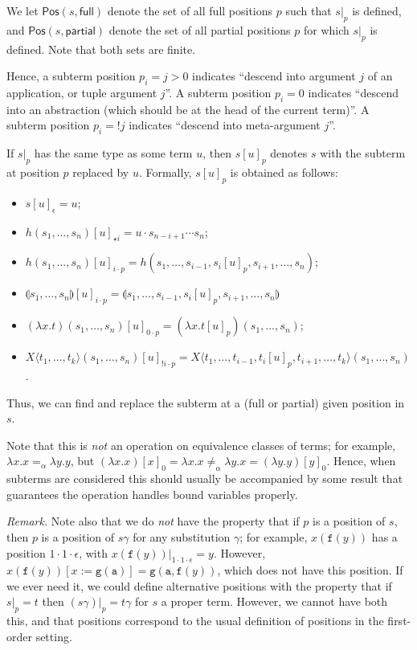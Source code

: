 \documentclass{lmcs}
\theoremstyle{theorem}\newtheorem{theorem}{Theorem}
\theoremstyle{theorem}\newtheorem{lemma}[theorem]{Lemma}
\theoremstyle{theorem}\newtheorem{corollary}[theorem]{Corollary}
\theoremstyle{definition}\newtheorem{definition}[theorem]{Definition}
\theoremstyle{definition}\newtheorem{example}[theorem]{Example}
\newcommand{\Positions}{\mathsf{Pos}}
\newcommand{\identifier}[1]{\mathtt{#1}}
\newcommand{\afun}{\identifier{f}}
\newcommand{\bfun}{\identifier{g}}
\newcommand{\avar}{x}
\newcommand{\Avar}{X}
\newcommand{\abs}[2]{\lambda #1.#2}
\newcommand{\meta}[2]{#1\langle#2\rangle}
\newcommand{\tuple}[2]{\llparenthesis #1,\dots,#2 \rrparenthesis}
\newcommand{\tuplelong}[1]{\llparenthesis #1 \rrparenthesis}
\begin{document}
We let $\Positions(s,\mathsf{full})$ denote the set of all full positions $p$
such that $s|_p$ is defined, and $\Positions(s,\mathsf{partial})$ denote the
set of all partial positions $p$ for which $s|_p$ is defined.  Note that both
sets are finite.

Hence, a subterm position $p_i = j > 0$ indicates ``descend into argument $j$
of an application, or tuple argument $j$''.  A subterm position $p_i = 0$
indicates ``descend into an abstraction (which should be at the head of the
current term)''.  A subterm position $p_i = !j$ indicates ``descend into
meta-argument $j$''.

If $s|_p$ has the same type as some term $u$, then $s[u]_p$ denotes $s$ with
the subterm at position $p$ replaced by $u$.  Formally, $s[u]_p$ is obtained as
follows:
\begin{itemize}
\item $s[u]_\epsilon = u$;
\item $h(s_1,\dots,s_n)[u]_{\star i} = u \cdot s_{n-i+1} \cdots s_n$;
\item $h(s_1,\dots,s_n)[u]_{i \cdot p} = h(s_1,\dots,s_{i-1},s_i[u]_p,s_{i+1},
  \dots,s_n)$;
\item $\tuple{s_1}{s_n}[u]_{i \cdot p} = \tuplelong{s_1,\dots,s_{i-1},s_i[u]_p,
  s_{i+1},\dots,s_n}$
\item $(\abs{\avar}{t})(s_1,\dots,s_n)[u]_{0 \cdot p} =
  (\abs{\avar}{t[u]_p})(s_1,\dots,s_n)$;
\item $\meta{\Avar}{t_1,\dots,t_k}(s_1,\dots,s_n)[u]_{!i \cdot p} =
  \meta{\Avar}{t_1,\dots,t_{i-1},t_i[u]_p,t_{i+1},\dots,t_k}(s_1,\dots,s_n)$.
\end{itemize}
Thus, we can find and replace the subterm at a (full or partial) given position
in $s$.

Note that this is \emph{not} an operation on equivalence classes of terms; for
example, $\abs{x}{x} =_\alpha \abs{y}{y}$, but $(\abs{x}{x})[x]_0 = \abs{x}{x}
\not =_\alpha \abs{y}{x} = (\abs{y}{y})[y]_0$.  Hence, when subterms are
considered this should usually be accompanied by some result that guarantees the
operation handles bound variables properly.

\emph{Remark.}
Note also that we do \emph{not} have the property that if $p$ is a position of
$s$, then $p$ is a position of $s\gamma$ for any substitution $\gamma$; for
example, $x(\afun(y))$ has a position $1 \cdot 1 \cdot \epsilon$, with
$x(\afun(y))|_{1 \cdot 1 \cdot \epsilon} = y$.  However, $x(\afun(y))[x:=
\bfun(\identifier{a})] = \bfun(\identifier{a},\afun(y))$, which does not have
this position.  If we ever need it, we could define alternative positions with
the property that if $s|_p = t$ then $(s\gamma)|_p = t\gamma$ for $s$ a proper
term.  However, we cannot have both this, and that positions correspond to the
usual definition of positions in the first-order setting.
\end{document}
